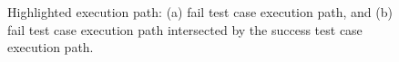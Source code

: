 
\begin{figure}[!ht]
\begin{center}
\caption{Highlighted execution path: (a) fail test case execution
path, and (b) fail test case execution path intersected by the
success test case execution path.}\label{fig:slice-source}
\end{center}
\end{figure}
